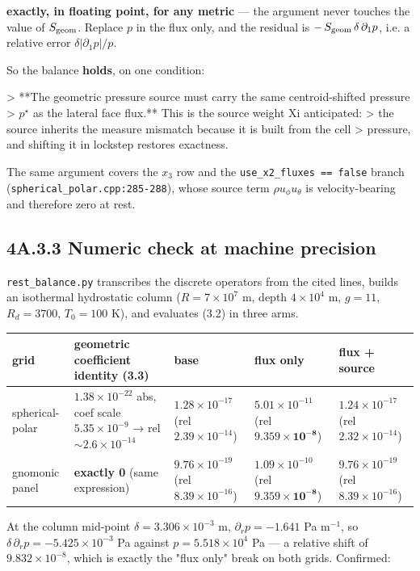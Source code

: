 \documentclass[11pt,a4paper]{article}
\begin{document}
\textbf{exactly, in floating point, for any metric} — the argument never touches the
value of $S_{\rm geom}$. Replace $p$ in the flux only, and the residual is
$-\,S_{\rm geom}\,\delta\,\partial_1p$, i.e. a relative error
$\delta|\partial_1p|/p$.

So the balance \textbf{holds}, on one condition:

> **The geometric pressure source must carry the same centroid-shifted pressure
> $p^\star$ as the lateral face flux.** This is the source weight Xi anticipated:
> the source inherits the measure mismatch because it is built from the cell
> pressure, and shifting it in lockstep restores exactness.

The same argument covers the $x_3$ row and the \texttt{use\_x2\_fluxes == false} branch
(\texttt{spherical\_polar.cpp:285-288}), whose source term $\rho u_\phi u_\theta$ is
velocity-bearing and therefore zero at rest.

\subsection*{4A.3.3 Numeric check at machine precision}

\texttt{rest\_balance.py} transcribes the discrete operators from the cited lines,
builds an isothermal hydrostatic column ($R=7\times10^7$ m, depth $4\times10^4$ m,
$g=11$, $R_d=3700$, $T_0=100$ K), and evaluates (3.2) in three arms.

\begin{longtable}{lllll}
\toprule
grid & geometric coefficient identity (3.3) & base & flux only & flux + source \\
\midrule
spherical-polar & $1.38\times10^{-22}$ abs, coef scale $5.35\times10^{-9}$ → rel $\sim\!2.6\times10^{-14}$ & $1.28\times10^{-17}$ (rel $2.39\times10^{-14}$) & $5.01\times10^{-11}$ (rel $\mathbf{9.359\times10^{-8}}$) & $1.24\times10^{-17}$ (rel $2.32\times10^{-14}$) \\
gnomonic panel & \textbf{exactly 0} (same expression) & $9.76\times10^{-19}$ (rel $8.39\times10^{-16}$) & $1.09\times10^{-10}$ (rel $\mathbf{9.359\times10^{-8}}$) & $9.76\times10^{-19}$ (rel $8.39\times10^{-16}$) \\
\bottomrule
\end{longtable}

At the column mid-point $\delta=3.306\times10^{-3}$ m,
$\partial_rp=-1.641$ Pa m$^{-1}$, so $\delta\,\partial_rp=-5.425\times10^{-3}$ Pa
against $p=5.518\times10^4$ Pa — a relative shift of $9.832\times10^{-8}$, which
is exactly the "flux only" break on both grids. Confirmed:
\end{document}
